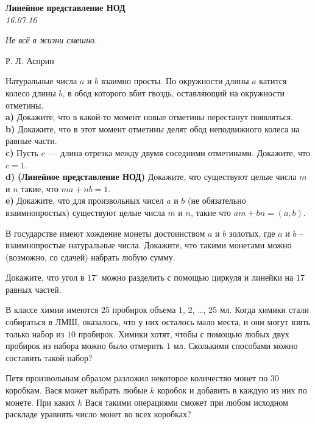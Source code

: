 \begin{center}
\textbf{\Large   Линейное представление НОД }\\
\textit{16.07.16}
\end{center}

\epigraph{\it Не всё в жизни смешно.}{Р. Л. Асприн}
 
\begin{problems}
\item Натуральные числа $a$ и $b$ взаимно просты. По окружности длины $a$ катится колесо
длины $b$, в обод которого вбит гвоздь, оставляющий на окружности отметины.\\
\textbf{a)} Докажите, что в какой-то момент новые отметины перестанут появляться.\\
 \textbf{b)} Докажите, что в этот момент отметины делят обод неподвижного колеса на равные части.\\ 
\textbf{c)} Пусть $c$~--- длина отрезка между двумя соседними отметинами. Докажите, что $c=1$.\\ 
\textbf{d)} \textbf{(Линейное представление НОД)} Докажите, что существуют целые числа $m$ и $n$ такие, что $m a+n b=1$.\\
\textbf{e)} Докажите, что для произвольных чисел $a$ и $b$ (не обязательно взаимнопростых) существуют целые числа $m$ и $n$, такие что $am+bn=(a,b)$.
\item В государстве имеют хождение монеты достоинством $a$ и $b$ золотых, где $a$ и $b$ -- взаимнопростые натуральные числа. Докажите, что такими монетами можно (возможно, со сдачей) набрать любую сумму.

\item Докажите, что угол в $17^{\circ}$ можно разделить с помощью циркуля и линейки на $17$ равных частей.

\item В классе химии имеются $25$ пробирок объема $1$, $2$, \ldots, $25$ мл. Когда химики стали собираться в ЛМШ, оказалось, что у них осталось мало места, и они могут взять только набор из $10$ пробирок. Химики хотят, чтобы с помощью любых двух пробирок из набора можно было отмерить $1$ мл. Сколькими способами можно составить такой набор?

\item Петя произвольным образом разложил некоторое количество монет по $30$ коробкам.
Вася может выбрать любые $k$ коробок и добавить в каждую из них по монете. При каких
$k$ Вася такими операциями сможет при любом исходном раскладе уравнять число монет
во всех коробках?


\end{problems}
